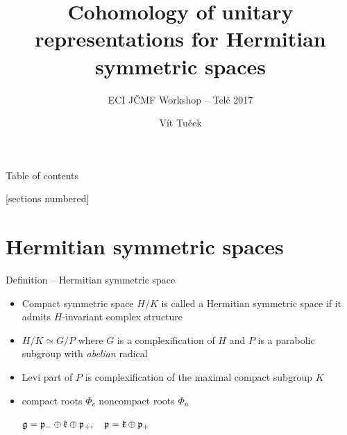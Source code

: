 \documentclass[10pt]{beamer}
\title{Cohomology of unitary representations for Hermitian symmetric spaces}
\subtitle{ECI \et JČMF Workshop -- Telč 2017}
\date{}
\author{Vít Tuček}
\institute{Mathematical Institute of Charles University}
\begin{document}

\maketitle


\begin{frame}{Table of contents}

[sections numbered]

\tableofcontents[hideallsubsections]

\end{frame}










\section{Hermitian symmetric spaces}


\begin{frame}{Definition -- Hermitian symmetric space}

\begin{itemize}%
\item Compact symmetric space $H/K$ is called a Hermitian symmetric space if it admits $H$-invariant complex structure
\item $H/K \simeq G/P$ where $G$ is a complexification of $H$ and $P$ is a parabolic subgroup with \emph{abelian} radical
\item  Levi part of $P$ is complexification of the maximal compact subgroup $K$
\item compact roots $\Phi_c$ \et noncompact roots $\Phi_n$ \\
      \begin{center}
       $\mathfrak{g} = \mathfrak{p}_- \oplus \mathfrak{k} \oplus \mathfrak{p}_+, \quad \mathfrak{p} = \mathfrak{k} \oplus \mathfrak{p}_+$
      \end{center}
\end{itemize}

\end{frame}
\end{document}
